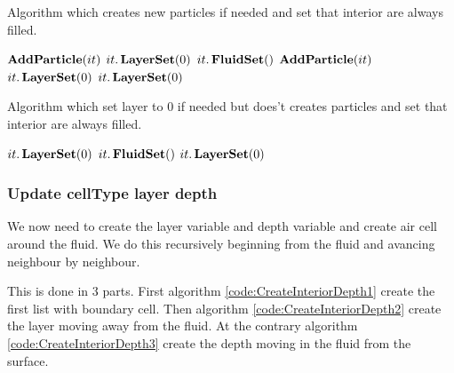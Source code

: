 \begin{algorithm}
\caption{Algorithm which creates new particles if needed and set that interior are always filled.}
\label{code:LayerInitialWithParticleDepth}
\begin{algorithmic}[1]
				\State $\mathop{\textbf{AddParticle}}(it)$
				\State $it.\mathop{\textbf{LayerSet}}(0)$
				\State $it.\mathop{\textbf{FluidSet}}()$
				\State $\mathop{\textbf{AddParticle}}(it)$
				\State $it.\mathop{\textbf{LayerSet}}(0)$
				\State $it.\mathop{\textbf{LayerSet}}(0)$
			\EndIf
\EndFor
\EndProcedure
\end{algorithmic}
\end{algorithm}

\begin{algorithm}
\caption{Algorithm which set layer to 0 if needed but does't creates particles and set that interior are always filled.}
\label{code:CreateInteriorDepth}
\begin{algorithmic}[1]
				\State $it.\mathop{\textbf{LayerSet}}(0)$
				\State $it.\mathop{\textbf{FluidSet}}()$
				\State $it.\mathop{\textbf{LayerSet}}(0)$
			\EndIf
\EndFor
\EndProcedure
\end{algorithmic}
\end{algorithm}

\subsubsection{Update cellType layer depth}

We now need to create the layer variable and depth variable and create air cell around the fluid.
We do this recursively beginning from the fluid and avancing neighbour by neighbour.

This is done in 3 parts. First algorithm \ref{code:CreateInteriorDepth1} create the first list with boundary cell.
Then algorithm \ref{code:CreateInteriorDepth2} create the layer moving away from the fluid.
At the contrary algorithm \ref{code:CreateInteriorDepth3} create the depth moving in the fluid from the surface.

